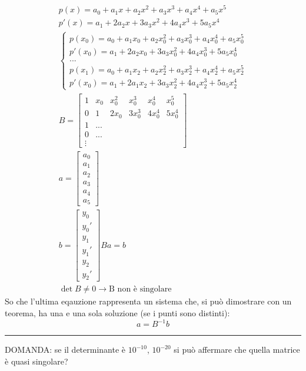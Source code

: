 \documentclass[a4paper, portrait]{book}
\numberwithin{equation}{chapter} %
\newcommand*\sepline{%
  \begin{center}
    \rule[1ex]{.5\textwidth}{.5pt}
  \end{center}}
\begin{document}
\begin{gather}
    p(x) = a_0 + a_1x + a_2x^2 + a_3 x^3 + a_4 x^4 + a_5 x^5\\
    p'(x) = a_1 + 2a_2 x + 3 a_3 x^2 + 4 a_4 x^3 + 5 a_5 x^4\\
    \begin{cases}
        p(x_0)=a_0 + a_1 x_0 + a_2 x_0^2 + a_3 x_0^3 + a_4 x_0^4 + a_5 x^5_0\\
        p'(x_0) = a_1 + 2 a_2 x_0 + 3 a_3 x_0^2 + 4 a_4 x_0^3 + 5 a_5 x_0^4\\
        ...\\
        p(x_1)=a_0 + a_1 x_2 + a_2 x_2^2 + a_3 x_2^3 + a_4 x_2^4 + a_5 x^5_2\\
        p'(x_0) = a_1 + 2 a_1 x_2 + 3 a_3 x_2^2 + 4 a_4 x_2^3 + 5 a_5 x_2^4
    \end{cases}\\
    B = \begin{bmatrix}
        1&x_0&x_0^2&x_0^3&x_0^4&x_0^5\\
        0&1&2x_0&3x_0^3&4x_0^4&5x_0^4\\
        1&...\\
        0&...\\
        \vdots
    \end{bmatrix}\\
    a = \begin{bmatrix}
        a_0\\a_1\\a_2\\a_3\\a_4\\a_5
    \end{bmatrix}\\
    b = \begin{bmatrix}
        y_0\\y_0'\\y_1\\y_1'\\y_2\\y_2'
    \end{bmatrix}
    Ba = b\\
    \det B \neq 0 \rightarrow \text{B non è singolare}
\end{gather}
So che l'ultima eqauzione rappresenta un sistema che, si può dimostrare con un teorema, ha una e una sola soluzione (se i punti sono distinti):
\begin{equation}
    a = B^{-1}b
\end{equation}
\sepline{}
DOMANDA: se il determinante è $10^{-10}$, $10^{-20}$ si può affermare che quella matrice è quasi singolare?\\
\end{document}
